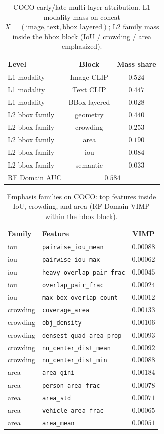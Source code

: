 
\begin{table}[ht]
\centering
\caption{COCO early/late multi-layer attribution. L1 modality mass on concat $X=(\mathrm{image},\mathrm{text},\mathrm{bbox\_layered})$; L2 family mass inside the bbox block (IoU / crowding / area emphasized).}
\label{tab:coco-layered-mass}
\small
\begin{tabular}{@{}l c c@{}}
\toprule
Level & Block & Mass share \\
\midrule
L1 modality & Image CLIP & $0.524$ \\
L1 modality & Text CLIP & $0.447$ \\
L1 modality & BBox layered & $0.028$ \\
\midrule
L2 bbox family & geometry & $0.440$ \\
L2 bbox family & crowding & $0.253$ \\
L2 bbox family & area & $0.190$ \\
L2 bbox family & iou & $0.084$ \\
L2 bbox family & semantic & $0.033$ \\
\midrule
RF Domain AUC & \multicolumn{2}{c}{$0.584$} \\
\bottomrule
\end{tabular}
\end{table}

\begin{table}[ht]
\centering
\caption{Emphasis families on COCO: top features inside IoU, crowding, and area (RF Domain VIMP within the bbox block).}
\label{tab:coco-layered-emphasis}
\small
\begin{tabular}{@{}l l c@{}}
\toprule
Family & Feature & VIMP \\
\midrule
iou & \texttt{pairwise\_iou\_mean} & $0.00088$ \\
iou & \texttt{pairwise\_iou\_max} & $0.00062$ \\
iou & \texttt{heavy\_overlap\_pair\_frac} & $0.00045$ \\
iou & \texttt{overlap\_pair\_frac} & $0.00024$ \\
iou & \texttt{max\_box\_overlap\_count} & $0.00012$ \\
\midrule
crowding & \texttt{coverage\_area} & $0.00133$ \\
crowding & \texttt{obj\_density} & $0.00106$ \\
crowding & \texttt{densest\_quad\_area\_prop} & $0.00093$ \\
crowding & \texttt{nn\_center\_dist\_mean} & $0.00092$ \\
crowding & \texttt{nn\_center\_dist\_min} & $0.00088$ \\
\midrule
area & \texttt{area\_gini} & $0.00184$ \\
area & \texttt{person\_area\_frac} & $0.00078$ \\
area & \texttt{area\_std} & $0.00071$ \\
area & \texttt{vehicle\_area\_frac} & $0.00065$ \\
area & \texttt{area\_mean} & $0.00051$ \\
\bottomrule
\end{tabular}
\end{table}

